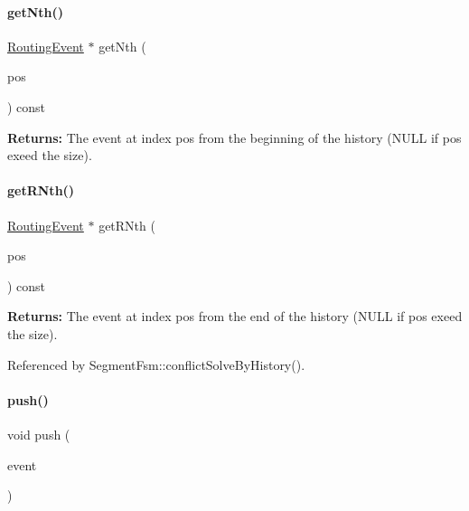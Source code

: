 \paragraph{\texorpdfstring{get\+Nth()}{getNth()}}
{\footnotesize\ttfamily \hyperlink{classKite_1_1RoutingEvent}{Routing\+Event} $\ast$ get\+Nth (\begin{DoxyParamCaption}\item[{size\+\_\+t}]{pos }\end{DoxyParamCaption}) const}

{\bfseries Returns\+:} The event at index {\ttfamily pos} from the beginning of the history ({\ttfamily N\+U\+LL} if {\ttfamily pos} exeed the size). \mbox{\label{classKite_1_1RoutingEventHistory_abf422c3119f0b121ce124aff979eafff}} 
\paragraph{\texorpdfstring{get\+R\+Nth()}{getRNth()}}
{\footnotesize\ttfamily \hyperlink{classKite_1_1RoutingEvent}{Routing\+Event} $\ast$ get\+R\+Nth (\begin{DoxyParamCaption}\item[{size\+\_\+t}]{pos }\end{DoxyParamCaption}) const}

{\bfseries Returns\+:} The event at index {\ttfamily pos} from the end of the history ({\ttfamily N\+U\+LL} if {\ttfamily pos} exeed the size). 

Referenced by Segment\+Fsm\+::conflict\+Solve\+By\+History().

\mbox{\label{classKite_1_1RoutingEventHistory_ac802427673567526d06af911e94f7216}} 
\paragraph{\texorpdfstring{push()}{push()}}
{\footnotesize\ttfamily void push (\begin{DoxyParamCaption}\item[{\hyperlink{classKite_1_1RoutingEvent}{Routing\+Event} $\ast$}]{event }\end{DoxyParamCaption})}

